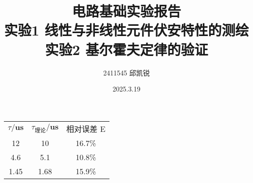 \documentclass{article}
\title{{电路基础实验报告}\\{\small 实验1 线性与非线性元件伏安特性的测绘}\\{\small 实验2 基尔霍夫定律的验证}}
\author{2411545 邱凯锐}
\date{2025.3.19}
\begin{document}
\maketitle
\begin{table}[h]
    \begin{tabular}{ccc}
    \hline\hline
     $\tau/\mathbf{us}$& $\tau_{理论}/\mathbf{us}$&相对误差 E\\
    12 & 10 &16.7\% \\
    4.6 & 5.1 &10.8\%\\
    1.45 & 1.68 &15.9\%\\
    \hline\hline
\end{tabular}
    \end{table}
\end{document}
